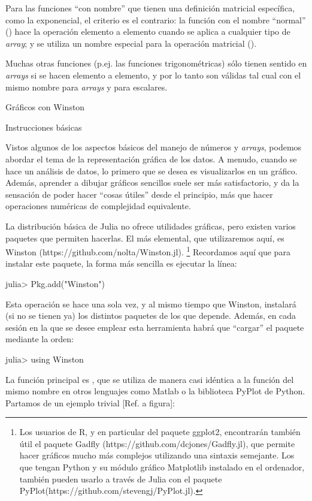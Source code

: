 ﻿\documentclass[spanish]{article}
\begin{document}
Para las funciones ``con nombre'' que tienen una definición matricial
específica, como la exponencial, el criterio es el contrario: la función
con el nombre ``normal'' () hace la operación elemento
a elemento cuando se aplica a cualquier tipo de \emph{array}; y se
utiliza un nombre especial para la operación matricial ().

Muchas otras funciones (p.ej. las funciones trigonométricas) sólo
tienen sentido en \emph{arrays} si se hacen elemento a elemento, y
por lo tanto son válidas tal cual con el mismo nombre para \emph{arrays}
y para escalares.




Gráficos con Winston

Instrucciones básicas

Vistos algunos de los aspectos básicos del manejo de números y \emph{arrays},
podemos abordar el tema de la representación gráfica de los datos. A menudo,
cuando se hace un análisis de datos, lo primero que se desea es visualizarlos
en un gráfico. Además, aprender a dibujar gráficos sencillos suele ser
más satisfactorio, y da la sensación de poder hacer ``cosas útiles'' desde
el principio, más que hacer operaciones numéricas de complejidad equivalente.

La distribución básica de Julia no ofrece utilidades gráficas, pero
existen varios paquetes que permiten hacerlas. El más elemental, que
utilizaremos aquí, es Winston (https://github.com/nolta/Winston.jl).%
\footnote{Los usuarios de R, y en particular del paquete ggplot2, encontrarán
también útil el paquete Gadfly (https://github.com/dcjones/Gadfly.jl),
que permite hacer gráficos mucho más complejos utilizando una sintaxis
semejante. Los que tengan Python y su módulo gráfico Matplotlib instalado
en el ordenador, también pueden usarlo a través de Julia con el paquete
PyPlot(https://github.com/stevengj/PyPlot.jl).}%
Recordamos aquí que para instalar este paquete, la forma más sencilla
es ejecutar la línea:

julia> Pkg.add("Winston")

Esta operación se hace una sola vez, y al mismo tiempo que Winston, instalará
(si no se tienen ya) los distintos paquetes de los que depende.
Además, en cada sesión en la que se desee emplear esta herramienta
habrá que ``cargar'' el paquete mediante la orden:

julia> using Winston

La función principal es , que se utiliza de manera casi
idéntica a la función del mismo nombre en otros lenguajes como Matlab o la
biblioteca PyPlot de Python. Partamos de un ejemplo trivial [Ref. a figura]:
\end{document}
